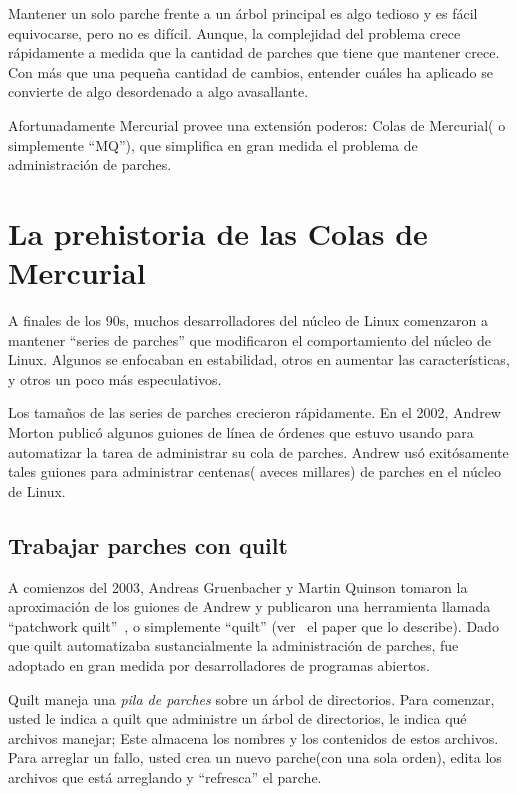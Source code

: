 Mantener un solo parche frente a un árbol principal es algo tedioso y
es fácil equivocarse, pero no es difícil.  Aunque, la complejidad del
problema crece rápidamente a medida que la cantidad de parches que
tiene que mantener crece.  Con más que una pequeña cantidad de
cambios, entender cuáles ha aplicado se convierte de algo desordenado
a algo avasallante.

Afortunadamente Mercurial provee una extensión poderos: Colas de
Mercurial( o simplemente ``MQ''), que simplifica en gran medida el
problema de administración de parches.

\section{La prehistoria de las Colas de Mercurial}
\label{sec:mq:history}

A finales de los 90s, muchos desarrolladores del núcleo de Linux
comenzaron a mantener ``series de parches'' que modificaron el
comportamiento del núcleo de Linux.  Algunos se enfocaban en
estabilidad, otros en aumentar las características, y otros un poco
más especulativos.

Los tamaños de las series de parches crecieron rápidamente.  En el
2002, Andrew Morton publicó algunos guiones de línea de órdenes que
estuvo usando para automatizar la tarea de administrar su cola de
parches.  Andrew usó exitósamente tales guiones para administrar
centenas( aveces millares) de parches en el núcleo de Linux.

\subsection{Trabajar parches con quilt}
\label{sec:mq:quilt}

A comienzos del 2003, Andreas Gruenbacher y Martin Quinson tomaron la
aproximación de los guiones de Andrew y publicaron una herramienta
llamada
``patchwork quilt''~\cite{web:quilt}, o simplemente ``quilt''
(ver~\cite{gruenbacher:2005} el paper que lo describe).  Dado que
quilt automatizaba sustancialmente la administración de parches, fue
adoptado en gran medida por desarrolladores de programas abiertos.

Quilt maneja una \emph{pila de parches} sobre un árbol de directorios.
Para comenzar, usted le indica a quilt que administre un árbol de
directorios, le indica qué archivos manejar; Este almacena los nombres
y los contenidos de estos archivos.  Para arreglar un fallo, usted
crea un nuevo parche(con una sola orden), edita los archivos que está
arreglando y ``refresca'' el parche.


